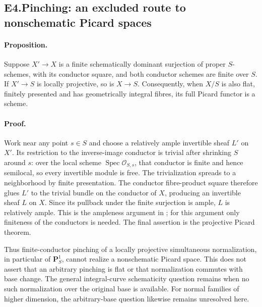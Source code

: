 \subsection*{E4.Pinching: an excluded route to nonschematic Picard spaces}

\paragraph{Proposition.}
Suppose $X'\to X$ is a finite schematically dominant surjection
of proper $S$-schemes, with its conductor square, and both conductor schemes are finite over
$S$. If $X'\to S$ is locally projective, so is $X\to S$.
Consequently, when $X/S$ is also flat, finitely presented and has
geometrically integral fibres, its full Picard functor is a scheme.

\paragraph{Proof.}
Work near any point $s\in S$ and choose a relatively ample invertible
sheaf $L'$ on $X'$. Its restriction to the inverse-image conductor is
trivial after shrinking $S$ around $s$: over the local scheme
$\operatorname{Spec}\mathcal O_{S,s}$, that conductor is finite and
hence semilocal, so every invertible module is free. The trivialization
spreads to a neighborhood by finite presentation. The conductor
fibre-product square therefore glues $L'$ to the trivial bundle on
the conductor of $X$, producing an invertible sheaf $L$ on $X$.
Since its pullback under the finite surjection is ample, $L$ is
relatively ample. This is the ampleness argument in
\cite[Proposition~2.4(i), p.~6]{BCEBrion2015}; for this argument only
finiteness of the conductors is needed. The final assertion is the
projective Picard theorem.

Thus finite-conductor pinching of a locally projective simultaneous
normalization, in particular of $\mathbf P^1_S$, cannot realize a
nonschematic Picard space. This does not assert that an arbitrary
pinching is flat or that normalization commutes with base change.
The general integral-curve schematicity question remains when no
such normalization over the original base is available. For normal
families of higher dimension, the arbitrary-base question likewise
remains unresolved here.
